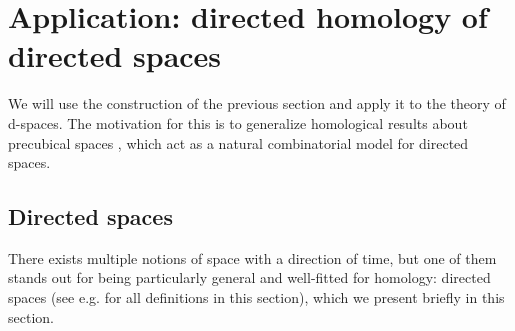 \documentclass[a4paper,fleqn]{cas-sc}
\begin{document}

\section{Application: directed homology of directed spaces}

We will use the construction of the previous section and apply it to the theory of d-spaces. The motivation for this is to generalize homological results about precubical spaces \cite{eric}, which act as a natural combinatorial model for directed spaces.

\subsection{Directed spaces}

There exists multiple notions of space with a direction of time, but one of them stands out for being particularly general and well-fitted for homology: directed spaces (see e.g. \cite{thebook,grandisbook} for all definitions in this section), which we present briefly in this section.
\end{document}
